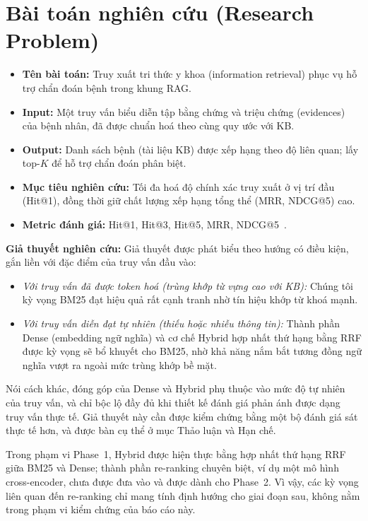
\section{Bài toán nghiên cứu (Research Problem)}
\label{sec:baitoan}

\begin{itemize}
    \item \textbf{Tên bài toán:} Truy xuất tri thức y khoa (information retrieval) phục vụ hỗ trợ chẩn đoán bệnh trong khung RAG.
    \item \textbf{Input:} Một truy vấn biểu diễn tập bằng chứng và triệu chứng (evidences) của bệnh nhân, đã được chuẩn hoá theo cùng quy ước với KB.
    \item \textbf{Output:} Danh sách bệnh (tài liệu KB) được xếp hạng theo độ liên quan; lấy top-$K$ để hỗ trợ chẩn đoán phân biệt.
    \item \textbf{Mục tiêu nghiên cứu:} Tối đa hoá độ chính xác truy xuất ở vị trí đầu (Hit@1), đồng thời giữ chất lượng xếp hạng tổng thể (MRR, NDCG@5) cao.
    \item \textbf{Metric đánh giá:} Hit@1, Hit@3, Hit@5, MRR, NDCG@5~\cite{jarvelin2002ndcg}.
\end{itemize}

\textbf{Giả thuyết nghiên cứu:} Giả thuyết được phát biểu theo hướng có điều kiện, gắn liền với đặc điểm của truy vấn đầu vào:
\begin{itemize}
    \item \textit{Với truy vấn đã được token hoá (trùng khớp từ vựng cao với KB):} Chúng tôi kỳ vọng BM25 đạt hiệu quả rất cạnh tranh nhờ tín hiệu khớp từ khoá mạnh.
    \item \textit{Với truy vấn diễn đạt tự nhiên (thiếu hoặc nhiễu thông tin):} Thành phần Dense (embedding ngữ nghĩa) và cơ chế Hybrid hợp nhất thứ hạng bằng RRF được kỳ vọng sẽ bổ khuyết cho BM25, nhờ khả năng nắm bắt tương đồng ngữ nghĩa vượt ra ngoài mức trùng khớp bề mặt.
\end{itemize}

Nói cách khác, đóng góp của Dense và Hybrid phụ thuộc vào mức độ tự nhiên của truy vấn, và chỉ bộc lộ đầy đủ khi thiết kế đánh giá phản ánh được dạng truy vấn thực tế. Giả thuyết này cần được kiểm chứng bằng một bộ đánh giá sát thực tế hơn, và được bàn cụ thể ở mục Thảo luận và Hạn chế.

Trong phạm vi Phase~1, Hybrid được hiện thực bằng hợp nhất thứ hạng RRF giữa BM25 và Dense; thành phần re-ranking chuyên biệt, ví dụ một mô hình cross-encoder, chưa được đưa vào và được dành cho Phase~2. Vì vậy, các kỳ vọng liên quan đến re-ranking chỉ mang tính định hướng cho giai đoạn sau, không nằm trong phạm vi kiểm chứng của báo cáo này.
